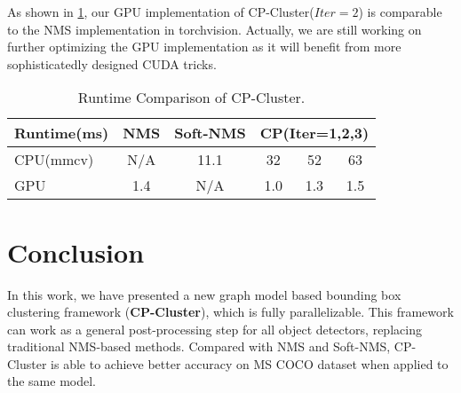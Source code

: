 \documentclass[10pt,twocolumn,letterpaper]{article}
\begin{document}
As shown in \cref{tab:exp_runtime}, our GPU implementation of CP-Cluster($Iter=2$) is comparable to the NMS implementation in torchvision. Actually, we are still working on further optimizing the GPU implementation as it will benefit from more sophisticatedly designed CUDA tricks.
\begin{table}[]
  \small
  \begin{tabular}{lccccc}
  \toprule
  Runtime(ms) & NMS & Soft-NMS & \multicolumn{3}{c}{CP(Iter=1,2,3)}               \\
  \midrule
  CPU(mmcv)   & N/A & 11.1     & \multicolumn{1}{c}{32}  & \multicolumn{1}{c}{52}  & 63  \\
  GPU         & 1.4 & N/A      & \multicolumn{1}{c}{1.0} & \multicolumn{1}{c}{1.3} & 1.5 \\
  \bottomrule
  \end{tabular}
  \caption{Runtime Comparison of CP-Cluster.}
  \label{tab:exp_runtime}
\end{table}
\section{Conclusion}
\label{sec:conclusion}
In this work, we have presented a new graph model based bounding box clustering framework (\textbf{CP-Cluster}), which is fully parallelizable.
This framework can work as a general post-processing step for all object detectors, replacing traditional NMS-based methods.
Compared with NMS and Soft-NMS, CP-Cluster is able to achieve better accuracy on MS COCO dataset when applied to the same model.\par

{\small


}
\end{document}
